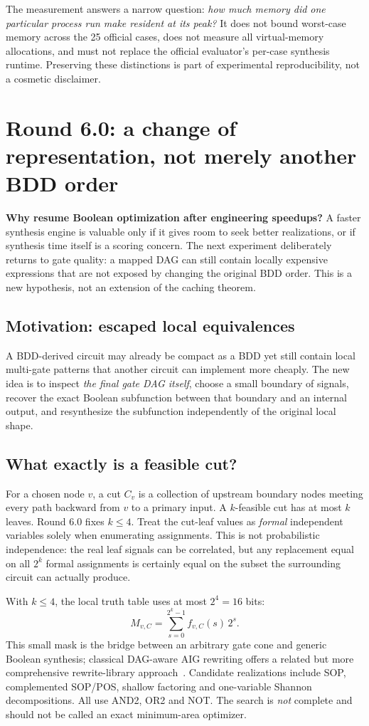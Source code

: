 The measurement answers a narrow question: \emph{how much memory did one particular process run make resident at its peak?} It does not bound worst-case memory across the 25 official cases, does not measure all virtual-memory allocations, and must not replace the official evaluator's per-case synthesis runtime. Preserving these distinctions is part of experimental reproducibility, not a cosmetic disclaimer.

\section{Round 6.0: a change of representation, not merely another BDD order}
\textbf{Why resume Boolean optimization after engineering speedups?} A faster synthesis engine is valuable only if it gives room to seek better realizations, or if synthesis time itself is a scoring concern. The next experiment deliberately returns to gate quality: a mapped DAG can still contain locally expensive expressions that are not exposed by changing the original BDD order. This is a new hypothesis, not an extension of the caching theorem.
\subsection{Motivation: escaped local equivalences}
A BDD-derived circuit may already be compact as a BDD yet still contain local multi-gate patterns that another circuit can implement more cheaply. The new idea is to inspect \emph{the final gate DAG itself}, choose a small boundary of signals, recover the exact Boolean subfunction between that boundary and an internal output, and resynthesize the subfunction independently of the original local shape.

\subsection{What exactly is a feasible cut?}
For a chosen node $v$, a cut $C_v$ is a collection of upstream boundary nodes meeting every path backward from $v$ to a primary input. A $k$-feasible cut has at most $k$ leaves. Round 6.0 fixes $k\le4$. Treat the cut-leaf values as \emph{formal} independent variables solely when enumerating assignments. This is not probabilistic independence: the real leaf signals can be correlated, but any replacement equal on all $2^k$ formal assignments is certainly equal on the subset the surrounding circuit can actually produce.

With $k\le4$, the local truth table uses at most $2^4=16$ bits:
\begin{equation}
 M_{v,C}=\sum_{s=0}^{2^k-1}f_{v,C}(s)\,2^s.
\end{equation}
This small mask is the bridge between an arbitrary gate cone and generic Boolean synthesis; classical DAG-aware AIG rewriting offers a related but more comprehensive rewrite-library approach~\cite{mishchenko2006,abc}. Candidate realizations include SOP, complemented SOP/POS, shallow factoring and one-variable Shannon decompositions. All use AND2, OR2 and NOT. The search is \emph{not} complete and should not be called an exact minimum-area optimizer.

